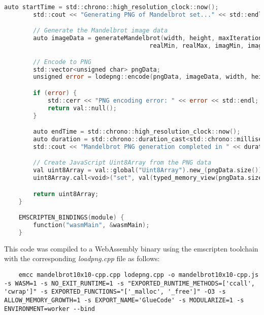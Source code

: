 \begin{lstlisting}[language=go, frame=tb, caption={Mandelbrot Set Calculation: C++ (WASM build)}]
        auto startTime = std::chrono::high_resolution_clock::now();
        std::cout << "Generating PNG of Mandelbrot set..." << std::endl;

        // Generate the Mandelbrot image data
        auto imageData = generateMandelbrot(width, height, maxIterations,
                                        realMin, realMax, imagMin, imagMax);

        // Encode to PNG
        std::vector<unsigned char> pngData;
        unsigned error = lodepng::encode(pngData, imageData, width, height);

        if (error) {
            std::cerr << "PNG encoding error: " << error << std::endl;
            return val::null();
        }

        auto endTime = std::chrono::high_resolution_clock::now();
        auto duration = std::chrono::duration_cast<std::chrono::milliseconds>(endTime - startTime);
        std::cout << "Mandelbrot PNG generation completed in " << duration.count() << "ms" << std::endl;

        // Create JavaScript Uint8Array from the PNG data
        val uint8Array = val::global("Uint8Array").new_(pngData.size());
        uint8Array.call<void>("set", val(typed_memory_view(pngData.size(), pngData.data())));

        return uint8Array;
    }

    EMSCRIPTEN_BINDINGS(module) {
        function("wasmMain", &wasmMain);
    }
\end{lstlisting}

This code was compiled to a WebAssembly binary using the emscripten \cite{methodology:emcc} toolchain with the corresponding \emph{loadpng.cpp} file as follows:
\begin{lstlisting}
    emcc mandelbrot10x10-cpp.cpp lodepng.cpp -o mandelbrot10x10-cpp.js -s WASM=1 -s NO_EXIT_RUNTIME=1 -s "EXPORTED_RUNTIME_METHODS=['ccall', 'cwrap']" -s EXPORTED_FUNCTIONS="['_malloc', '_free']" -O3 -s ALLOW_MEMORY_GROWTH=1 -s EXPORT_NAME='GlueCode' -s MODULARIZE=1 -s ENVIRONMENT=worker --bind
\end{lstlisting}